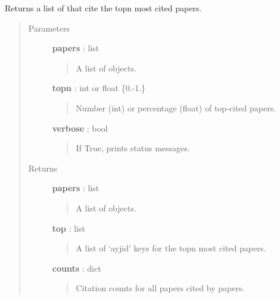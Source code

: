 \documentclass[letterpaper,10pt,english]{sphinxmanual}
\begin{document}
\begin{fulllineitems}
\label{tethne.networks.helpers:tethne.networks.helpers.top_parents}
Returns a list of {\hyperref[tethne.classes.paper:tethne.classes.paper.Paper]{}} that cite the topn most cited papers.
\begin{quote}\begin{description}
\item[{Parameters}] \leavevmode
\textbf{papers} : list
\begin{quote}

A list of {\hyperref[tethne.classes.paper:tethne.classes.paper.Paper]{}} objects.
\end{quote}

\textbf{topn} : int or float \{0.-1.\}
\begin{quote}

Number (int) or percentage (float) of top-cited papers.
\end{quote}

\textbf{verbose} : bool
\begin{quote}

If True, prints status messages.
\end{quote}

\item[{Returns}] \leavevmode
\textbf{papers} : list
\begin{quote}

A list of {\hyperref[tethne.classes.paper:tethne.classes.paper.Paper]{}} objects.
\end{quote}

\textbf{top} : list
\begin{quote}

A list of `ayjid' keys for the topn most cited papers.
\end{quote}

\textbf{counts} : dict
\begin{quote}

Citation counts for all papers cited by papers.
\end{quote}

\end{description}\end{quote}

\end{fulllineitems}
\end{document}

